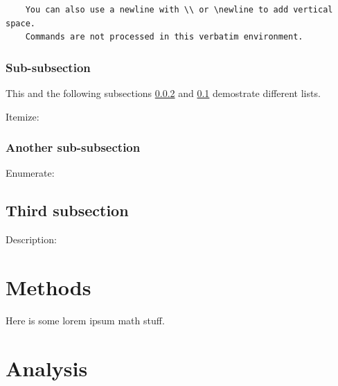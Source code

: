 \documentclass[12pt, a4paper, oneside]{article}
\begin{document}
\begin{verbatim}
    You can also use a newline with \\ or \newline to add vertical space.
    Commands are not processed in this verbatim environment.
\end{verbatim}

\subsubsection{Sub-subsection}

This and the following subsections \ref{subsubsec:another} and \ref{subsec:third-subsection} demostrate different lists.

Itemize:
\blinditemize

\subsubsection{Another sub-subsection} \label{subsubsec:another}

Enumerate:
\blindenumerate

\subsection{Third subsection} \label{subsec:third-subsection}

Description:
\blinddescription

\clearpage


\section{Methods} \label{sec:methods}

Here is some lorem ipsum math stuff.

\blindmathpaper

\clearpage


\section{Analysis} \label{sec:analysis}

\blindtext[2]
\end{document}

